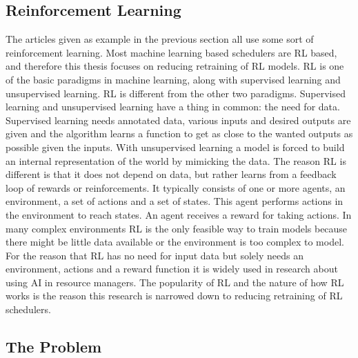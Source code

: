 \subsection{Reinforcement Learning}

The articles given as example in the previous section all use some sort of
reinforcement learning. Most machine learning based schedulers are RL based,
and therefore this thesis focuses on reducing retraining of RL models. RL is
one of the basic paradigms in machine learning, along with supervised learning
and unsupervised learning. RL is different from the other two paradigms.
Supervised learning and unsupervised learning have a thing in common: the need
for data. Supervised learning needs annotated data, various inputs and desired
outputs are given and the algorithm learns a function to get as close to the
wanted outputs as possible given the inputs. With unsupervised learning a
model is forced to build an internal representation of the world by mimicking
the data. The reason RL is different is that it does not depend on data, but
rather learns from a feedback loop of rewards or reinforcements. It typically
consists of one or more agents, an environment, a set of actions and a set of
states. This agent performs actions in the environment to reach states. An
agent receives a reward for taking actions. In many complex environments RL is
the only feasible way to train models because there might be little data
available or the environment is too complex to model. For the reason that RL
has no need for input data but solely needs an environment, actions and a reward
function it is widely used in research about using AI in resource managers.
The popularity of RL and the nature of how RL works is the reason this
research is narrowed down to reducing retraining of RL schedulers.


\subsection{The Problem}

